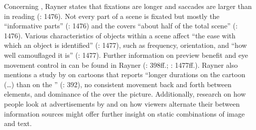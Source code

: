 Concerning , Rayner states that fixations are longer and saccades are larger than in reading (\citeyear{rayner2009}: 1476). Not every part of a scene is fixated but mostly the “informative parts” (\citeyear{rayner2009}: 1476) and the  covers “about half of the total scene” (\citeyear{rayner2009}: 1476). Various characteristics of objects within a scene affect “the ease with which an object is identified” (\citealt{rayner2009}: 1477), such as frequency, orientation, and “how well camouflaged it is” (\citeyear{rayner2009}: 1477). Further information on preview benefit and eye movement control in  can be found in Rayner (\citeyear{rayner1998}: 398ff.; \citeyear{rayner2009}: 1477ff.). Rayner also mentions a study by \citet{Carroll1992} on cartoons that reports “longer  durations on the cartoon (…) than on the ” (\citealt{rayner1998}: 392), no consistent movement back and forth between elements, and dominance of the  over the picture. Additionally, research on how people look at advertisements by \citet{pieters2008} and on how viewers alternate their  between information sources \citep{rayner2001} might offer further insight on static combinations of image and text.

